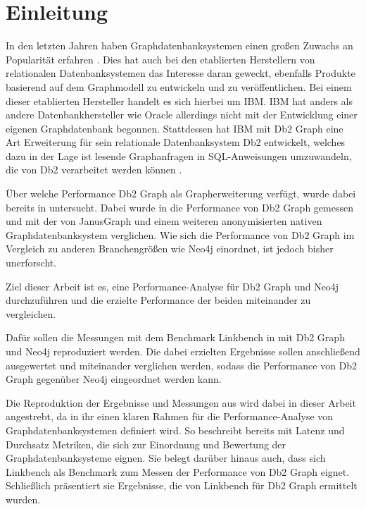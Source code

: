 \chapter{Einleitung}
\label{einleitung}

In den letzten Jahren haben Graphdatenbanksystemen einen großen Zuwachs an Popularität erfahren \cite{db_engines_ranking_july}. Dies hat auch bei den etablierten Herstellern von relationalen Datenbanksystemen das Interesse daran geweckt, ebenfalls Produkte basierend auf dem Graphmodell zu entwickeln und zu veröffentlichen. Bei einem dieser etablierten Hersteller handelt es sich hierbei um IBM. IBM hat anders als andere Datenbankhersteller wie Oracle allerdings nicht mit der Entwicklung einer eigenen Graphdatenbank begonnen. Stattdessen hat IBM mit Db2 Graph eine Art Erweiterung für sein relationale Datenbanksystem Db2 entwickelt, welches dazu in der Lage ist lesende Graphanfragen in SQL-Anweisungen umzuwandeln, die von Db2 verarbeitet werden können \cite{sigmod_tian}. 

Über welche Performance Db2 Graph als Grapherweiterung verfügt, wurde dabei bereits in \cite{sigmod_tian} untersucht. Dabei wurde in \cite{sigmod_tian} die Performance von Db2 Graph gemessen und mit der von JanusGraph und einem weiteren anonymisierten nativen Graphdatenbanksystem verglichen. Wie sich die Performance von Db2 Graph im Vergleich zu anderen Branchengrößen wie Neo4j einordnet, ist jedoch bisher unerforscht. 

Ziel dieser Arbeit ist es, eine Performance-Analyse für Db2 Graph und Neo4j durchzuführen und die erzielte Performance der beiden miteinander zu vergleichen.

Dafür sollen die Messungen mit dem Benchmark Linkbench in \cite{sigmod_tian} mit Db2 Graph und Neo4j reproduziert werden. Die dabei erzielten Ergebnisse sollen anschließend ausgewertet und miteinander verglichen werden, sodass die Performance von Db2 Graph gegenüber Neo4j eingeordnet werden kann.

Die Reproduktion der Ergebnisse und Messungen aus \cite{sigmod_tian} wird dabei in dieser Arbeit angestrebt, da in ihr einen klaren Rahmen für die Performance-Analyse von Graphdatenbanksystemen definiert wird. So beschreibt \cite{sigmod_tian} bereits mit Latenz und Durchsatz Metriken, die sich zur Einordnung und Bewertung der Graphdatenbanksysteme eignen. Sie belegt darüber hinaus auch, dass sich Linkbench als Benchmark zum Messen der Performance von Db2 Graph eignet. Schließlich präsentiert sie Ergebnisse, die von Linkbench für Db2 Graph ermittelt wurden. 

